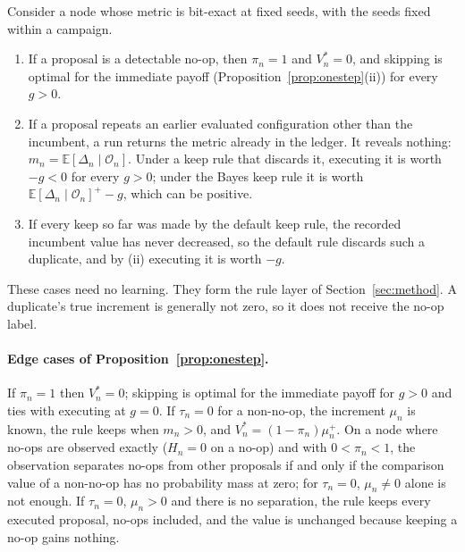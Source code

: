 \begin{proposition}\label{prop:app-rules}
Consider a node whose metric is bit-exact at fixed seeds, with the seeds fixed within a campaign.
\begin{enumerate}
\item[(i)] If a proposal is a detectable no-op, then $\pi_n=1$ and $V^*_n=0$, and skipping is optimal for the immediate payoff (Proposition~\ref{prop:onestep}(ii)) for every $g>0$.
\item[(ii)] If a proposal repeats an earlier evaluated configuration other than the incumbent, a run returns the metric already in the ledger. It reveals nothing: $m_n=\mathbb{E}[\Delta_n\mid\mathcal{O}_n]$. Under a keep rule that discards it, executing it is worth $-g<0$ for every $g>0$; under the Bayes keep rule it is worth $\mathbb{E}[\Delta_n\mid\mathcal{O}_n]^+-g$, which can be positive.
\item[(iii)] If every keep so far was made by the default keep rule, the recorded incumbent value has never decreased, so the default rule discards such a duplicate, and by (ii) executing it is worth $-g$.
\end{enumerate}
\end{proposition}

These cases need no learning. They form the rule layer of Section~\ref{sec:method}. A duplicate's true increment is generally not zero, so it does not receive the no-op label.

\paragraph{Edge cases of Proposition~\ref{prop:onestep}.}
If $\pi_n=1$ then $V^*_n=0$; skipping is optimal for the immediate payoff for $g>0$ and ties with executing at $g=0$. If $\tau_n=0$ for a non-no-op, the increment $\mu_n$ is known, the rule keeps when $m_n>0$, and $V^*_n=(1-\pi_n)\mu_n^+$. On a node where no-ops are observed exactly ($H_n=0$ on a no-op) and with $0<\pi_n<1$, the observation separates no-ops from other proposals if and only if the comparison value of a non-no-op has no probability mass at zero; for $\tau_n=0$, $\mu_n\neq0$ alone is not enough. If $\tau_n=0$, $\mu_n>0$ and there is no separation, the rule keeps every executed proposal, no-ops included, and the value is unchanged because keeping a no-op gains nothing.

